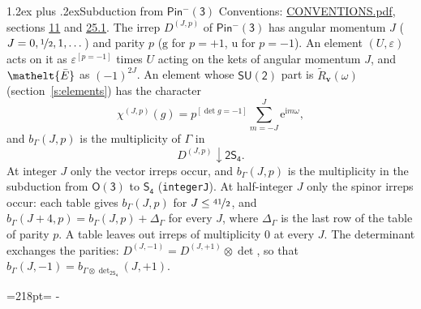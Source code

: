 \documentclass[10pt,a4paper]{article}
\makeatletter
\renewcommand\section{\@startsection{section}{1}{\z@}{-3ex plus -1ex minus -.2ex}%
  {1.2ex plus .2ex}{\normalfont\large\sffamily\bfseries\color{parttitle}}}
\newcommand{\needspace}[1]{\par\penalty-100\begingroup\dimen0=#1\relax\dimen2=\pagegoal
  \advance\dimen2-\pagetotal\ifdim\dimen0>\dimen2\relax\ifdim\dimen2>0pt\vfil\break\fi\fi
  \endgroup}
\numberwithin{equation}{section}
\newcommand{\eltfont}[1]{{\let\sigma\eltsigma\mathelt{#1}}}
\newcommand{\grp}[1]{\mathsf{#1}}
\newcommand{\elt}[1]{\eltfont{#1}}
\newcommand{\ptag}[1]{\mathrm{#1}}
\newcommand{\iverson}[1]{[#1]}
\newcommand{\restr}[2]{#1\!\downarrow#2}
\newcommand{\vv}{\mathbf{v}}
\newcommand{\iunit}{\mathrm{i}}
\newcommand{\expe}{\mathrm{e}}
\newcommand{\irrJp}[2]{D^{(#1,#2)}}
\newcommand{\irrprod}{\otimes}
\newcommand{\barred}[1]{\bar{#1}}
\newcommand{\lift}[1]{\tilde{#1}}
\makeatother
\begin{document}
\section{Subduction from \texorpdfstring{$\grp{Pin^{-}(3)}$}{Pin(3)}}\label{s:subduction_parent}
Conventions: \href{../../CONVENTIONS.pdf}{CONVENTIONS.pdf}, sections \href{../../../rotation/CONVENTIONS.pdf\#conv.11}{11} and \href{../../CONVENTIONS.pdf\#conv.25.1}{25.1}.
\leavevmode\label{n:index.J}\label{n:index.parity}\label{n:irrep.o3}The irrep $\irrJp{J}{p}$ of \href{Pinminus3.pdf}{$\grp{Pin^{-}(3)}$} has angular momentum $J$ ($J = 0, \nicefrac{1}{2}, 1, \dots$) and parity $p$ ($\ptag{g}$ for $p = +1$, $\ptag{u}$ for $p = -1$). An element $(U, \varepsilon)$ acts on it as $\varepsilon^{[p = -1]}$ times $U$ acting on the kets of angular momentum $J$, and $\elt{\barred{E}}$ as $(-1)^{2J}$. \label{n:function.character.parent}\label{n:function.multiplicity}An element whose $\grp{SU(2)}$ part is $\lift{R}_{\vv}(\omega)$ (section~\ref{s:elements}) has the character
\begin{equation}\label{e:chi}\chi^{(J,p)}(g) = p^{\iverson{\det g = -1}}\sum_{m=-J}^{J} \expe^{\iunit m\omega},\end{equation}
and $b_\Gamma(J, p)$ is the multiplicity of $\Gamma$ in
\begin{equation}\label{e:parent}\restr{\irrJp{J}{p}}{\grp{2S_{4}}}.\end{equation}
At integer $J$ only the vector irreps occur, and $b_\Gamma(J, p)$ is the multiplicity in the subduction from $\grp{O(3)}$ to \href{../../../rotation/data/pdf/S4.pdf}{$\grp{S_{4}}$} (\texttt{integerJ}). \label{n:index.increment}At half-integer $J$ only the spinor irreps occur: each table gives $b_\Gamma(J, p)$ for $J \le \nicefrac{41}{2}$, and $b_\Gamma(J + 4, p) = b_\Gamma(J, p) + \Delta_\Gamma$ for every $J$, where $\Delta_\Gamma$ is the last row of the table of parity $p$. A table leaves out irreps of multiplicity 0 at every $J$.
\leavevmode\label{n:operator.determinant.character}The determinant exchanges the parities: $\irrJp{J}{-1} = \irrJp{J}{+1} \irrprod \det$, so that $b_\Gamma(J, -1) = b_{\Gamma \irrprod \det_{\grp{2S_{4}}}}(J, +1)$.
\needspace{218pt}
\end{document}
